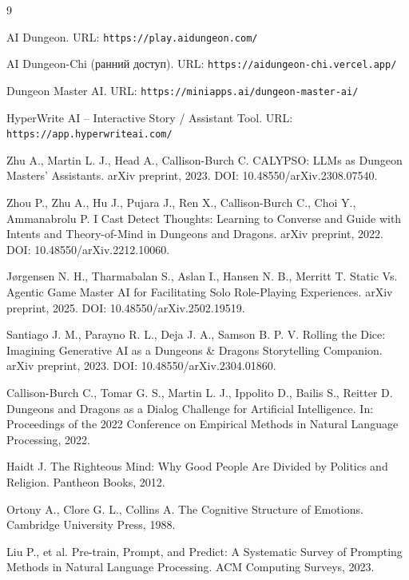 \documentclass[a4paper,14pt]{extarticle}
\begin{document}
\begin{thebibliography}{9}

AI Dungeon. URL: \texttt{https://play.aidungeon.com/}

AI Dungeon-Chi (ранний доступ). URL: \texttt{https://aidungeon-chi.vercel.app/}

Dungeon Master AI. URL: \texttt{https://miniapps.ai/dungeon-master-ai/}

HyperWrite AI – Interactive Story / Assistant Tool. URL: \texttt{https://app.hyperwriteai.com/}

Zhu A., Martin L. J., Head A., Callison-Burch C. CALYPSO: LLMs as Dungeon Masters' Assistants. arXiv preprint, 2023. DOI: 10.48550/arXiv.2308.07540.

Zhou P., Zhu A., Hu J., Pujara J., Ren X., Callison-Burch C., Choi Y., Ammanabrolu P. I Cast Detect Thoughts: Learning to Converse and Guide with Intents and Theory-of-Mind in Dungeons and Dragons. arXiv preprint, 2022. DOI: 10.48550/arXiv.2212.10060.

Jørgensen N. H., Tharmabalan S., Aslan I., Hansen N. B., Merritt T. Static Vs. Agentic Game Master AI for Facilitating Solo Role-Playing Experiences. arXiv preprint, 2025. DOI: 10.48550/arXiv.2502.19519.

Santiago J. M., Parayno R. L., Deja J. A., Samson B. P. V. Rolling the Dice: Imagining Generative AI as a Dungeons \& Dragons Storytelling Companion. arXiv preprint, 2023. DOI: 10.48550/arXiv.2304.01860.

Callison-Burch C., Tomar G. S., Martin L. J., Ippolito D., Bailis S., Reitter D. Dungeons and Dragons as a Dialog Challenge for Artificial Intelligence. In: Proceedings of the 2022 Conference on Empirical Methods in Natural Language Processing, 2022.

Haidt J. The Righteous Mind: Why Good People Are Divided by Politics and Religion. Pantheon Books, 2012.

Ortony A., Clore G. L., Collins A. The Cognitive Structure of Emotions. Cambridge University Press, 1988.

Liu P., et al. Pre-train, Prompt, and Predict: A Systematic Survey of Prompting Methods in Natural Language Processing. ACM Computing Surveys, 2023.

\end{thebibliography}
\end{document}
